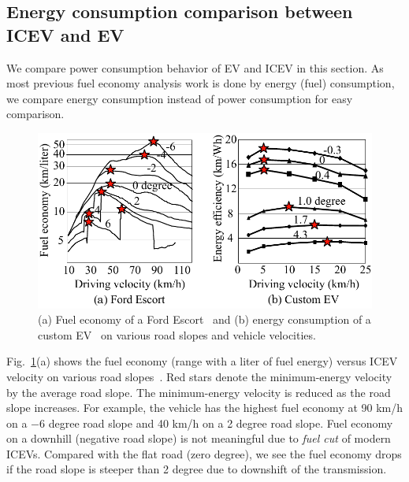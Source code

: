\documentclass{IEEEtran}
\begin{document}
\subsection{Energy consumption comparison between ICEV and EV} \label{subsec:comparison}

We compare power consumption behavior of EV and ICEV in this section. As most previous fuel economy analysis work is done by energy (fuel) consumption, we compare energy consumption instead of power consumption for easy comparison. 

\begin{figure}	%
\includegraphics[width=1.0\hsize]{Figures/ICEV_EV_consumption.pdf}
\caption{(a) Fuel economy of a Ford Escort~\cite{Hooker:TR88} and (b) energy consumption of a custom EV~\cite{Chang:ICCAD14} on various road slopes and vehicle velocities.}
\label{fig:ICEV_EV_consumption}
\end{figure} 

Fig.~\ref{fig:ICEV_EV_consumption}(a) shows the fuel economy (range with a liter of fuel energy) versus ICEV velocity on various road slopes~\cite{Hooker:TR88}. Red stars denote  the minimum-energy velocity by the average road slope. The minimum-energy velocity is reduced as the road slope increases. For example, the vehicle has the highest fuel economy at 90 km/h on  a $-6$ degree road slope and 40 km/h on a 2 degree road slope.  Fuel economy on a downhill (negative road slope) is not meaningful due to  \textit{fuel cut} of modern ICEVs. Compared with the flat road (zero degree), we see the fuel economy drops if the road slope is steeper than 2 degree due to downshift of the transmission. 
\end{document}
